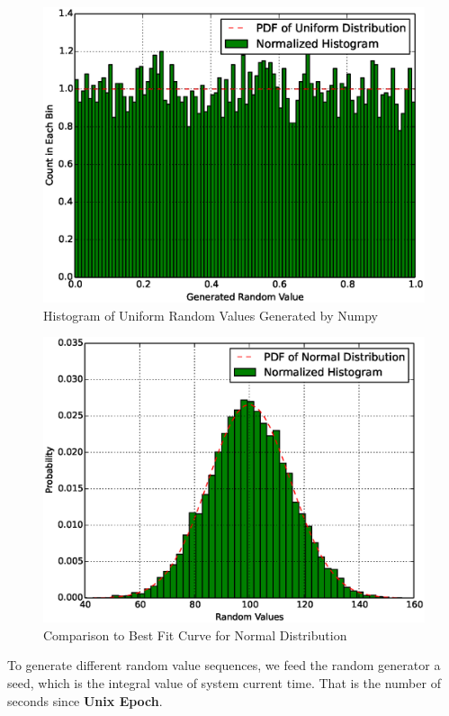 \documentclass[12pt]{article}  %
\theoremstyle{definition}
\theoremstyle{remark}
\begin{document}
\begin{figure}
\centering
        \includegraphics[scale=0.6]{rg_histogram.eps}
        \caption{Histogram of Uniform Random Values Generated by Numpy}
        \label{fig:uniform}
\end{figure}
\begin{figure}
        \centering
        \includegraphics[scale=0.6]{rg_fitness.eps}
        \caption{Comparison to Best Fit Curve for Normal Distribution}
        \label{fig:normal}
\end{figure}

To generate different random value sequences, we feed the random generator a seed, which is the integral value of system current time.
That is the number of seconds since \textbf{Unix Epoch}.
\end{document}

